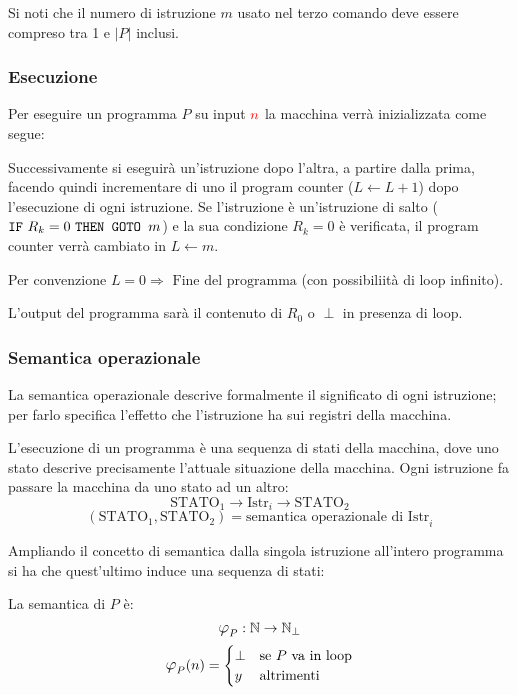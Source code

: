Si noti che il numero di istruzione $m$ usato nel terzo comando deve essere compreso tra
1 e $|P|$ inclusi.

\subsubsection*{Esecuzione}
Per eseguire un programma $P$ su input $\color{red}n$ la macchina verrà inizializzata come segue:
\begin{figure}[H]
    \centering
    
\end{figure}

Successivamente si eseguirà un'istruzione dopo l'altra, a partire dalla prima, facendo quindi
incrementare di uno il program counter ($L\leftarrow L+1$) dopo l'esecuzione di ogni istruzione.
Se l'istruzione è un'istruzione di salto ($\texttt{IF}\text{ $R_k=0$ }\texttt{THEN GOTO }\text{$m$}$) e la sua condizione $R_k=0$
è verificata, il program counter verrà cambiato in $L\leftarrow m$.

Per convenzione $L=0 \Rightarrow \text{ Fine del programma}$ (con possibiliità di loop infinito).

L'output del programma sarà il contenuto di $R_0$ o $\perp$ in presenza di loop.

\subsubsection*{Semantica operazionale}
La semantica operazionale descrive formalmente il significato di ogni istruzione; per farlo
specifica l'effetto che l'istruzione ha sui registri della macchina.

L'esecuzione di un programma è una sequenza di stati della macchina, dove uno stato descrive
precisamente l'attuale situazione della macchina. Ogni istruzione fa passare la macchina da
uno stato ad un altro:
$$ \text{STATO}_1 \rightarrow \boxed{\text{Istr}_i} \rightarrow \text{STATO}_2 $$
$$ (\text{STATO}_1,\text{STATO}_2) = \text{semantica operazionale di Istr}_i $$

Ampliando il concetto di semantica dalla singola istruzione all'intero programma si ha che 
quest'ultimo induce una sequenza di stati:
\begin{figure}[H]
    \centering
    
\end{figure}

La semantica di $P$ è:
$$ \semanticaRAM_P:\N\to\N_\perp $$
$$ \semanticaRAM_P(n) = \begin{cases}
\perp & \text{se $P$ va in loop}\\
y & \text{altrimenti}
\end{cases} $$

